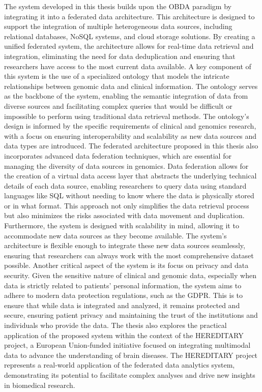 The system developed in this thesis builds upon the \ac{OBDA} paradigm by integrating it into a federated data architecture. This architecture is designed to support the integration of multiple heterogeneous data sources, including relational databases, NoSQL systems, and cloud storage solutions. By creating a unified federated system, the architecture allows for real-time data retrieval and integration, eliminating the need for data deduplication and ensuring that researchers have access to the most current data available.
A key component of this system is the use of a specialized ontology that models the intricate relationships between genomic data and clinical information. The ontology serves as the backbone of the system, enabling the semantic integration of data from diverse sources and facilitating complex queries that would be difficult or impossible to perform using traditional data retrieval methods. The ontology's design is informed by the specific requirements of clinical and genomics research, with a focus on ensuring interoperability and scalability as new data sources and data types are introduced.
The federated architecture proposed in this thesis also incorporates advanced data federation techniques, which are essential for managing the diversity of data sources in genomics. Data federation allows for the creation of a virtual data access layer that abstracts the underlying technical details of each data source, enabling researchers to query data using standard languages like \ac{SQL} without needing to know where the data is physically stored or in what format. This approach not only simplifies the data retrieval process but also minimizes the risks associated with data movement and duplication.
Furthermore, the system is designed with scalability in mind, allowing it to accommodate new data sources as they become available. The system's architecture is flexible enough to integrate these new data sources seamlessly, ensuring that researchers can always work with the most comprehensive dataset possible.
Another critical aspect of the system is its focus on privacy and data security. Given the sensitive nature of clinical and genomic data, especially when data is strictly related to patients' personal information, the system aims to adhere to modern data protection regulations, such as the \ac{GDPR}. This is to ensure that while data is integrated and analyzed, it remains protected and secure, ensuring patient privacy and maintaining the trust of the institutions and individuals who provide the data.
The thesis also explores the practical application of the proposed system within the context of the \ac{HEREDITARY} project, a European Union-funded initiative focused on integrating multimodal data to advance the understanding of brain diseases. The \ac{HEREDITARY} project represents a real-world application of the federated data analytics system, demonstrating its potential to facilitate complex analyses and drive new insights in biomedical research.
